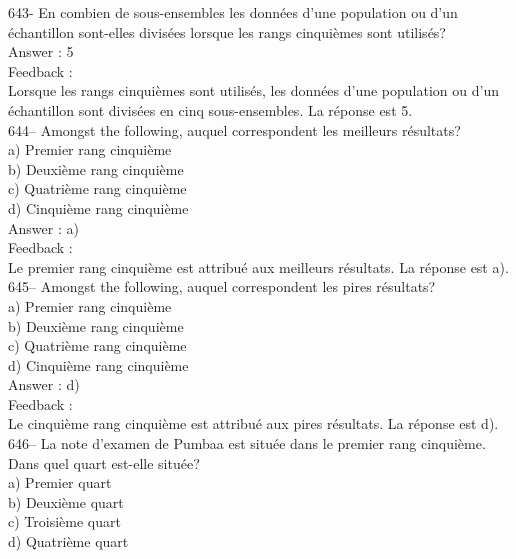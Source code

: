 ﻿\documentclass[letterpaper, 12pt]{article}
\begin{document}
643- En combien de sous-ensembles les donn\'ees d'une population ou d'un
\'echantillon sont-elles divis\'ees lorsque les rangs cinqui\`emes sont
utilis\'es?\\

Answer : 5\\

Feedback : \\
Lorsque les rangs cinqui\`emes sont utilis\'es, les donn\'ees d'une
population ou d'un \'echantillon sont divis\'ees en cinq sous-ensembles.  La
r\'eponse est 5.\\

644-- Amongst the following, auquel correspondent les meilleurs
r\'esultats?\\
a) Premier rang cinqui\`eme\\
b) Deuxi\`eme rang cinqui\`eme\\
c) Quatri\`eme rang cinqui\`eme\\
d) Cinqui\`eme rang cinqui\`eme\\

Answer : a)\\

Feedback : \\
Le premier rang cinqui\`eme est attribu\'e aux meilleurs r\'esultats.  La
r\'eponse est a).\\

645-- Amongst the following, auquel correspondent les pires
r\'esultats?\\
a) Premier rang cinqui\`eme\\
b) Deuxi\`eme rang cinqui\`eme\\
c) Quatri\`eme rang cinqui\`eme\\
d) Cinqui\`eme rang cinqui\`eme\\

Answer : d)\\

Feedback : \\
Le cinqui\`eme rang cinqui\`eme est attribu\'e aux pires r\'esultats.  La
r\'eponse est d).\\

646-- La note d'examen de Pumbaa est situ\'ee dans le premier rang
cinqui\`eme.  Dans quel quart est-elle situ\'ee?\\
a) Premier quart\\
b) Deuxi\`eme quart\\
c) Troisi\`eme quart\\
d) Quatri\`eme quart\\
\end{document}
